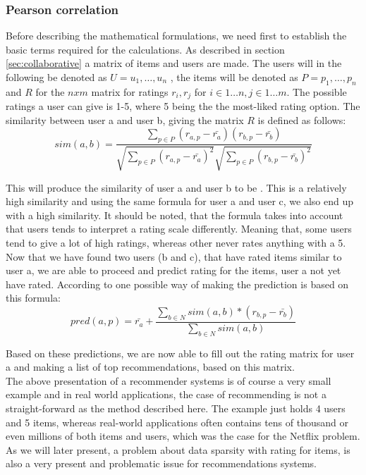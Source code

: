 \subsubsection{Pearson correlation}
Before describing the mathematical formulations, we need first to establish the basic terms required for the calculations. As described in section \ref{sec:collaborative} a matrix of items and users are made. The users will in the following be denoted as \( U = {u_{1}, \ldots , u_{n}} \) , the items will be denoted as \( P = {p_{1}, \ldots , p_{n}} \) and \(R\) for the \({n x m}\) matrix for ratings \(r_{i}, r_{j}\) for \(i \in 1 \ldots n, j \in 1 \ldots m\). The possible ratings a user can give is 1-5, where 5 being the the most-liked rating option. 
The similarity between user a and user b, giving the matrix \(R\) is defined as follows:\\

\[
	sim(a,b) = \frac{\sum_{p\in P} (r_{a,p} - \bar{r_{a}})(r_{b,p} - \bar{r_{b}})}{\sqrt{\sum_{p\in P} (r_{a,p} - \bar{r_{a}})^2} \sqrt{\sum_{p\in P} (r_{b,p} - \bar{r_{b}})^2}}
\]


This will produce the similarity of user a and user b to be . This is a relatively high similarity and using the same formula for user a and user c, we also end up with a high similarity. It should be noted, that the formula takes into account that users tends to interpret a rating scale differently. Meaning that, some users tend to give a lot of high ratings, whereas other never rates anything with a 5. 
Now that we have found two users (b and c), that have rated items similar to user a, we are able to proceed and predict rating for the items, user a not yet have rated. According to  one possible way of making the prediction is based on this formula:\\

\[
	pred(a,p) = \bar{r_{a}} + \frac{\sum_{b\in N} sim(a,b) * (r_{b,p} - \bar{r_{b}})}{\sum_{b\in N} sim(a,b)}
\]

Based on these predictions, we are now able to fill out the rating matrix for user a and making a list of top recommendations, based on this matrix. \\

The above presentation of a recommender systems is of course a very small example and in real world applications, the case of recommending is not a straight-forward as the method described here. The example just holds 4 users and 5 items, whereas real-world applications often contains tens of thousand or even millions of both items and users, which was the case for the Netflix problem. As we will later present, a problem about data sparsity with rating for items, is also a very present and problematic issue for recommendations systems.  

